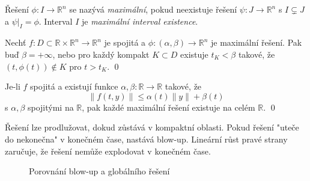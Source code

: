 \begin{definition}
Řešení $\phi: I \to \mathbb{R}^n$ se nazývá \emph{maximální}, pokud neexistuje řešení $\psi: J \to \mathbb{R}^n$ s $I \subsetneq J$ a $\psi|_I = \phi$. Interval $I$ je \emph{maximální interval existence}.
\end{definition}

\begin{theorem}
Nechť $f: D \subset \mathbb{R} \times \mathbb{R}^n \to \mathbb{R}^n$ je spojitá a $\phi: (\alpha, \beta) \to \mathbb{R}^n$ je maximální řešení. Pak buď $\beta = +\infty$, nebo pro každý kompakt $K \subset D$ existuje $t_K < \beta$ takové, že $(t, \phi(t)) \notin K$ pro $t > t_K$.
\qed
\end{theorem}

\begin{theorem}
Je-li $f$ spojitá a existují funkce $\alpha, \beta: \mathbb{R} \to \mathbb{R}$ takové, že
\[
\|f(t,y)\| \leq \alpha(t)\|y\| + \beta(t)
\]
s $\alpha, \beta$ spojitými na $\mathbb{R}$, pak každé maximální řešení existuje na celém $\mathbb{R}$.
\qed
\end{theorem}

\begin{intuition}
Řešení lze prodlužovat, dokud zůstává v kompaktní oblasti. Pokud řešení "uteče do nekonečna" v konečném čase, nastává blow-up. Lineární růst pravé strany zaručuje, že řešení nemůže explodovat v konečném čase.
\end{intuition}

\begin{figure}[htbp]
\centering
{}
\caption{Porovnání blow-up a globálního řešení}
\label{fig:blowup-global}
\end{figure}

